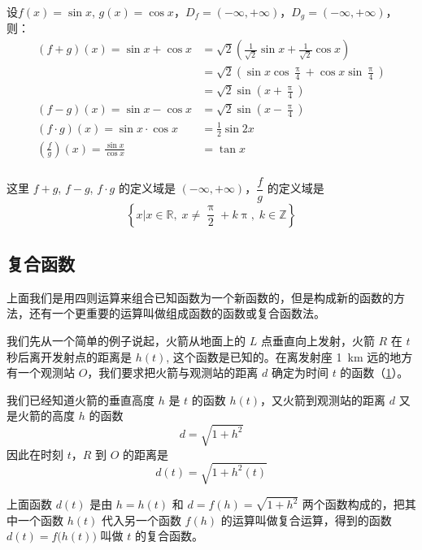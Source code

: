 \begin{example}
设$f(x)=\sin x$, $g(x)=\cos x$，$D_f=(-\infty,+\infty)$，$D_g=(-\infty,+\infty)$，则：
\[\begin{split}
    (f+g)(x)=\sin x+\cos x&=\sqrt{2}\left(\frac{1}{\sqrt{2}}\sin x+\frac{1}{\sqrt{2}}\cos x\right)\\
    &=\sqrt{2}\left(\sin x\cos\frac{\uppi}{4}+\cos x\sin\frac{\uppi}{4} \right)\\
    &=\sqrt{2}\sin\left(x+\frac{\uppi}{4}\right)\\
    (f-g)(x)=\sin x-\cos x&=\sqrt{2}\sin\left(x-\frac{\uppi}{4}\right)\\
    (f\cdot g)(x)=\sin x\cdot \cos x&=\frac{1}{2}\sin 2x\\
    \left(\frac{f}{g}\right)(x)=\frac{\sin x}{\cos x}&=\tan x\\
\end{split}\]    

这里 $f+g$, $f-g$, $f\cdot g$ 的定义域是 $(-\infty,+\infty)$，$\dfrac{f}{g}$ 的定义域是
\[\left\{x\big|x\in\mathbb{R},\; x\ne \frac{\uppi}{2}+k\uppi,\; k\in \mathbb{Z}\right\}\]
\end{example}

\subsection{复合函数}
上面我们是用四则运算来组合已知函数为一个新函数的，但是构成新的函数的方法，还有一个更重要的运算叫做组成函数的函数或复合函数法。

我们先从一个简单的例子说起，火箭从地面上的 $L$ 点垂直向上发射，火箭 $R$ 在 $t$ 秒后离开发射点的距离是 $h(t)$, 这个函数是已知的。在离发射座 \qty{1}{km} 远的地方有一个观测站 $O$，我们要求把火箭与观测站的距离 $d$ 确定为时间 $t$ 的函数（\cref{fig:function_d_vs_t}）。
\begin{figure}
    \caption{}\label{fig:function_d_vs_t}
\end{figure}

我们已经知道火箭的垂直高度 $h$ 是 $t$ 的函数 $h(t)$，又火箭到观测站的距离 $d$ 又是火箭的高度 $h$ 的函数
\[d=\sqrt{1+h^2}\]
因此在时刻 $t$，$R$ 到 $O$ 的距离是
\[d(t)=\sqrt{1+h^2(t)}\]

上面函数 $d(t)$ 是由 $h=h(t)$ 和 $d=f(h)=\sqrt{1+h^2}$ 两个函数构成的，把其中一个函数 $h(t)$ 代入另一个函数 $f(h)$ 的运算叫做复合运算，得到的函数 $d(t)=f\big(h(t)\big)$ 叫做 $t$ 的复合函数。

